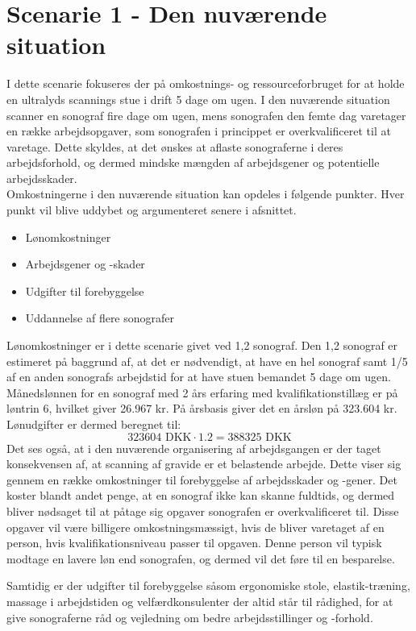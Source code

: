 \section{Scenarie 1 - Den nuværende situation}
I dette scenarie fokuseres der på omkostnings- og ressourceforbruget for at holde en ultralyds scannings stue i drift 5 dage om ugen. I den nuværende situation scanner en sonograf fire dage om ugen, mens sonografen den femte dag varetager en række arbejdsopgaver, som sonografen i princippet er overkvalificeret til at varetage. Dette skyldes, at det ønskes at aflaste sonograferne i deres arbejdsforhold, og dermed mindske mængden af arbejdsgener og potentielle arbejdsskader. \\
Omkostningerne i den nuværende situation kan opdeles i følgende punkter. Hver punkt vil blive uddybet og argumenteret senere i afsnittet. 
\begin{itemize}
\item Lønomkostninger
\item Arbejdsgener og -skader
\item Udgifter til forebyggelse
\item Uddannelse af flere sonografer
\end{itemize}
Lønomkostninger er i dette scenarie givet ved 1,2 sonograf. Den 1,2 sonograf er estimeret på baggrund af, at det er nødvendigt, at have en hel sonograf samt 1/5 af en anden sonografs arbejdstid for at have stuen bemandet 5 dage om ugen. Månedslønnen for en sonograf med 2 års erfaring med kvalifikationstillæg er på løntrin 6, hvilket giver 26.967 kr. På årsbasis giver det en årsløn på 323.604 kr. Lønudgifter er dermed beregnet til:
\begin{equation}
323604 \text{ DKK}\cdot1.2 = 388325 \text{ DKK}
\end{equation}
Det ses også, at i den nuværende organisering af arbejdsgangen er der taget konsekvensen af, at scanning af gravide er et belastende arbejde. Dette viser sig gennem en række omkostninger til forebyggelse af arbejdsskader og -gener. Det koster blandt andet penge, at en sonograf ikke kan skanne fuldtids, og dermed bliver nødsaget til at påtage sig opgaver sonografen er overkvalificeret til. Disse opgaver vil være billigere omkostningsmæssigt, hvis de bliver varetaget af en person, hvis kvalifikationsniveau passer til opgaven. Denne person vil typisk modtage en lavere løn end sonografen, og dermed vil det føre til en besparelse. 

Samtidig er der udgifter til forebyggelse såsom ergonomiske stole, elastik-træning, massage i arbejdstiden og velfærdkonsulenter der altid står til rådighed, for at give sonograferne råd og vejledning om bedre arbejdsstillinger og -forhold. 

